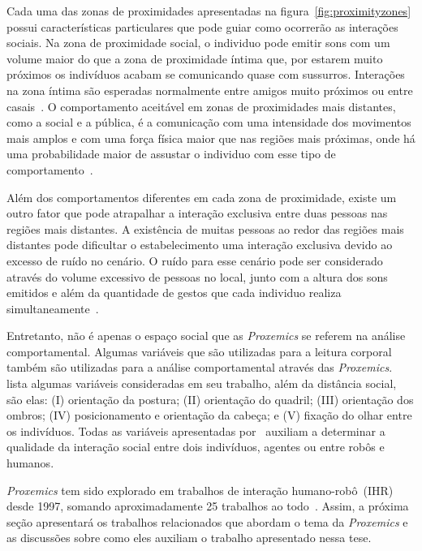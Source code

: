 Cada uma das zonas de proximidades apresentadas na figura~\ref{fig:proximityzones} possui características particulares que pode guiar como ocorrerão as interações sociais. Na zona de proximidade social, o individuo pode emitir sons com um volume maior do que a zona de proximidade íntima que, por estarem muito próximos os indivíduos acabam se comunicando quase com sussurros. Interações na zona íntima são esperadas normalmente entre amigos muito próximos ou entre casais~\cite{Hall:1969, Argyle:1988}. O comportamento aceitável em zonas de proximidades mais distantes, como a social e a pública, é a comunicação com uma intensidade dos movimentos mais amplos e com uma força física maior que nas regiões mais próximas, onde há uma probabilidade maior de assustar o individuo com esse tipo de comportamento~\cite{Henkel:2014}.

Além dos comportamentos diferentes em cada zona de proximidade, existe um outro fator que pode atrapalhar a interação exclusiva entre duas pessoas nas regiões mais distantes. A existência de muitas pessoas ao redor das regiões mais distantes pode dificultar o estabelecimento uma interação exclusiva devido ao excesso de ruído no cenário. O ruído para esse cenário pode ser considerado através do volume excessivo de pessoas no local, junto com a altura dos sons emitidos e além da quantidade de gestos que cada individuo realiza simultaneamente~\cite{Walters:2009, Henkel:2014}.

Entretanto, não é apenas o espaço social que as \emph{Proxemics} se referem na análise comportamental. Algumas variáveis que são utilizadas para a leitura corporal também são utilizadas para a análise comportamental através das \emph{Proxemics}.  lista algumas variáveis consideradas em seu trabalho, além da distância social, são elas: (I) orientação da postura; (II) orientação do quadril; (III) orientação dos ombros; (IV) posicionamento e orientação da cabeça; e (V) fixação do olhar entre os indivíduos. Todas as variáveis apresentadas por~ auxiliam a determinar a qualidade da interação social entre dois indivíduos, agentes ou entre robôs e humanos.

\emph{Proxemics} tem sido explorado em trabalhos de interação humano-robô~(IHR) desde 1997, somando aproximadamente 25 trabalhos ao todo~\cite{Henkel:2014}. Assim, a próxima seção apresentará os trabalhos relacionados que abordam o tema da \emph{Proxemics} e as discussões sobre como eles auxiliam o trabalho apresentado nessa tese.

